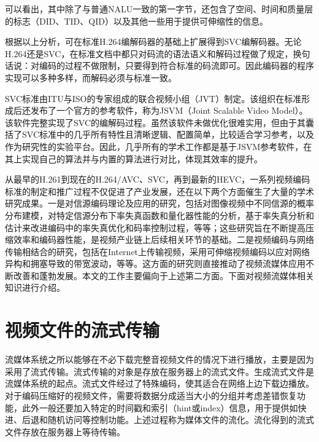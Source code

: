 可以看出，其中除了与普通NALU一致的第一字节，还包含了空间、时间和质量层的标志（DID、TID、QID）以及其他一些用于提供可伸缩性的信息。

根据以上分析，可在标准H.264编解码器的基础上扩展得到SVC编解码器。无论H.264还是SVC，在标准文档中都只对码流的语法语义和解码过程做了规定，换句话说：对编码的过程不做限制，只要得到符合标准的码流即可。因此编码器的程序实现可以多种多样，而解码必须与标准一致。
 
SVC标准由ITU与ISO的专家组成的联合视频小组（JVT）制定。该组织在标准形成后还发布了一个官方的参考软件，称为JSVM（Joint Scalable Video Model）\supercite{JSVM}。该软件完整实现了SVC的编解码过程。虽然该软件未做优化很难实用，但由于其囊括了SVC标准中的几乎所有特性且清晰逻辑、配置简单，比较适合学习参考，以及作为研究性的实验平台。因此，几乎所有的学术工作都是基于JSVM参考软件，在其上实现自己的算法并与内置的算法进行对比，体现其效率的提升。

从最早的H.261到现在的H.264/AVC、SVC，再到最新的HEVC，一系列视频编码标准的制定和推广过程不仅促进了产业发展，还在以下两个方面催生了大量的学术研究成果。一是对信源编码理论及应用的研究，包括对图像视频中不同信源的概率分布建模\supercite{Birney-TIP1995, Lam-TIP2000, Sharifi-TCSVT1995, Kamaci-TCSVT2005}，对特定信源分布下率失真函数和量化器性能的分析\supercite{He-TCSVT2001, Gary-TIT1996, Gary-VCIP2005}，基于率失真分析和估计来改进编码中的率失真优化和码率控制过程\supercite{Gary-SPM1998, Lin-TCSVT1998, Sun-TCSVT2006, Lee-TCSVT2014}，等等；这些研究旨在不断提高压缩效率和编码器性能，是视频产业链上后续相关环节的基础。二是视频编码与网络传输相结合的研究\supercite{Sun-book-2001}，包括在Internet上传输视频\supercite{Wu-TCSVT2001, Conklin-TCSVT2001}，采用可伸缩视频编码以应对网络异构和拥塞导致的带宽波动\supercite{Wu-IEEE2001, Ohm-IEEE2005}，等等。这方面的研究则直接推动了视频流媒体应用不断改善和蓬勃发展。本文的工作主要偏向于上述第二方面。下面对视频流媒体相关知识进行介绍。

\section{视频文件的流式传输}

流媒体系统之所以能够在不必下载完整音视频文件的情况下进行播放，主要是因为采用了流式传输。流式传输的对象是存放在服务器上的流式文件。生成流式文件是流媒体系统的起点。流式文件经过了特殊编码，使其适合在网络上边下载边播放。对于编码压缩好的视频文件，需要将数据分成适当大小的分组并考虑差错恢复功能，此外一般还要加入特定的时间戳和索引（hint或index）信息，用于提供如快进、后退和随机访问等控制功能。上述过程称为媒体文件的流化。流化得到的流式文件存放在服务器上等待传输。

